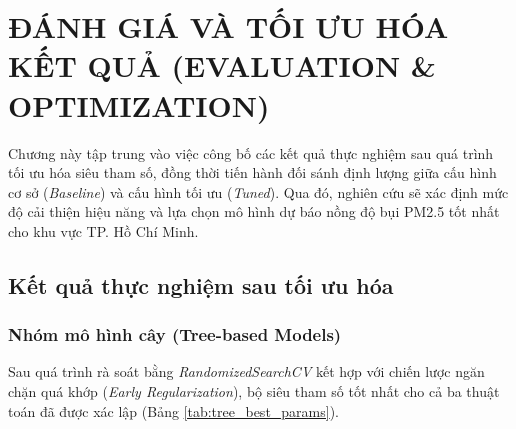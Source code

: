 ﻿\chapter{ĐÁNH GIÁ VÀ TỐI ƯU HÓA KẾT QUẢ (EVALUATION \& OPTIMIZATION)}

Chương này tập trung vào việc công bố các kết quả thực nghiệm sau quá trình tối ưu hóa siêu tham số, đồng thời tiến hành đối sánh định lượng giữa cấu hình cơ sở (\textit{Baseline}) và cấu hình tối ưu (\textit{Tuned}). Qua đó, nghiên cứu sẽ xác định mức độ cải thiện hiệu năng và lựa chọn mô hình dự báo nồng độ bụi PM2.5 tốt nhất cho khu vực TP. Hồ Chí Minh.

\section{Kết quả thực nghiệm sau tối ưu hóa}

\subsection{Nhóm mô hình cây (Tree-based Models)}

Sau quá trình rà soát bằng \textit{RandomizedSearchCV} kết hợp với chiến lược ngăn chặn quá khớp (\textit{Early Regularization}), bộ siêu tham số tốt nhất cho cả ba thuật toán đã được xác lập (Bảng \ref{tab:tree_best_params}).

